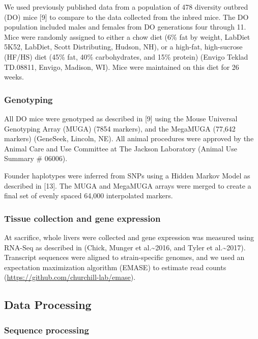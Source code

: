 \documentclass[10pt,letterpaper]{article}
\begin{document}
We used previously published data from a population of 478 diversity
outbred (DO) mice {[}9{]} to compare to the data collected from the
inbred mice. The DO population included males and females from DO
generations four through 11. Mice were randomly assigned to either a
chow diet (6\% fat by weight, LabDiet 5K52, LabDiet, Scott Distributing,
Hudson, NH), or a high-fat, high-sucrose (HF/HS) diet (45\% fat, 40\%
carbohydrates, and 15\% protein) (Envigo Teklad TD.08811, Envigo,
Madison, WI). Mice were maintained on this diet for 26 weeks.

\hypertarget{genotyping}{%
\subsubsection{Genotyping}\label{genotyping}}

All DO mice were genotyped as described in {[}9{]} using the Mouse
Universal Genotyping Array (MUGA) (7854 markers), and the MegaMUGA
(77,642 markers) (GeneSeek, Lincoln, NE). All animal procedures were
approved by the Animal Care and Use Committee at The Jackson Laboratory
(Animal Use Summary \# 06006).

Founder haplotypes were inferred from SNPs using a Hidden Markov Model
as described in {[}13{]}. The MUGA and MegaMUGA arrays were merged to
create a final set of evenly spaced 64,000 interpolated markers.

\hypertarget{tissue-collection-and-gene-expression}{%
\subsubsection{Tissue collection and gene
expression}\label{tissue-collection-and-gene-expression}}

At sacrifice, whole livers were collected and gene expression was
measured using RNA-Seq as described in (Chick, Munger et
al.\textasciitilde2016, and Tyler et al.\textasciitilde2017). Transcript
sequences were aligned to strain-specific genomes, and we used an
expectation maximization algorithm (EMASE) to estimate read counts
(\url{https://github.com/churchill-lab/emase}).

\hypertarget{data-processing}{%
\subsection{Data Processing}\label{data-processing}}

\hypertarget{sequence-processing}{%
\subsubsection{Sequence processing}\label{sequence-processing}}
\end{document}
